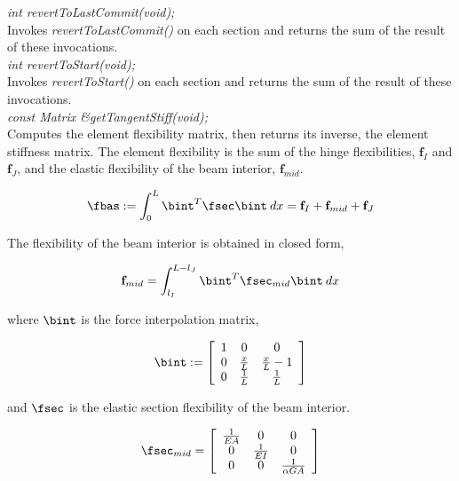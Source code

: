{\em int revertToLastCommit(void);} \\
Invokes {\em revertToLastCommit()} on each section and returns the sum of the result of
these invocations. \\

{\em int revertToStart(void);} \\
Invokes {\em revertToStart()} on each section and returns the sum of the result of
these invocations. \\

{\em const Matrix \&getTangentStiff(void);} \\
Computes the element flexibility matrix, then returns its inverse, the element
stiffness matrix. The element flexibility is the sum of the hinge flexibilities,
$\mathbf{f}_I$ and $\mathbf{f}_J$, and the elastic flexibility of the beam interior,
$\mathbf{f}_{mid}$.

\begin{equation}
\label{eq:fele}
\fbas := \int_{0}^{L}{\bint^T \fsec \bint \: dx} = \mathbf{f}_I + \mathbf{f}_{mid} + \mathbf{f}_J
\end{equation}

The flexibility of the beam interior is obtained in closed form,

\begin{equation}
\mathbf{f}_{mid} = \int_{l_I}^{L-l_J}{\bint^T \fsec_{mid} \bint \: dx}
\end{equation}

where $\bint$ is the force interpolation matrix,

\begin{equation}
\bint := \left[
   \begin{array}{c c c}
      1 &           0 &               0 \\
      0 & \frac{x}{L} & \frac{x}{L} - 1 \\
      0 & \frac{1}{L} &     \frac{1}{L}
   \end{array} 
 \right]
\end{equation}

and $\fsec$ is the elastic section flexibility of the beam interior.

\begin{equation}
\fsec_{mid} = \left[
   \begin{array}{c c c}
      \frac{1}{EA} &            0 &                   0 \\
                 0 & \frac{1}{EI} &                   0 \\
                 0 &            0 & \frac{1}{\alpha GA}
   \end{array}
 \right]
\end{equation}

